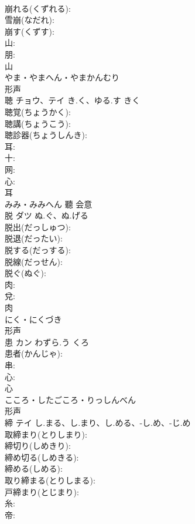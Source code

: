 \documentclass[8pt]{extreport}
\begin{document}
\begin{CJK}{UTF8}{min}
\\	崩れる(くずれる): 
\\	雪崩(なだれ): 
\\	崩す(くずす): 
\\	山: 
\\	朋: 
\\	山	
\\	やま・やまへん・やまかんむり	
\\	形声 
\\	聴	チョウ、テイ	き.く、ゆる.す	きく	
\\	聴覚(ちょうかく): 
\\	聴講(ちょうこう): 
\\	聴診器(ちょうしんき): 
\\	耳: 
\\	十: 
\\	网: 
\\	心: 
\\	耳	
\\	みみ・みみへん	聽	会意 
\\	脱	ダツ	ぬ.ぐ、ぬ.げる		
\\	脱出(だっしゅつ): 
\\	脱退(だったい): 
\\	脱する(だっする): 
\\	脱線(だっせん): 
\\	脱ぐ(ぬぐ): 
\\	肉: 
\\	兌: 
\\	肉	
\\	にく・にくづき	
\\	形声 
\\	患	カン	わずら.う	くろ	
\\	患者(かんじゃ): 
\\	串: 
\\	心: 
\\	心	
\\	こころ・したごころ・りっしんべん	
\\	形声 
\\	締	テイ	し.まる、し.まり、し.める、-し.め、-じ.め		
\\	取締まり(とりしまり): 
\\	締切り(しめきり): 
\\	締め切る(しめきる): 
\\	締める(しめる): 
\\	取り締まる(とりしまる): 
\\	戸締まり(とじまり): 
\\	糸: 
\\	帝: 

\end{CJK}
\end{document}

